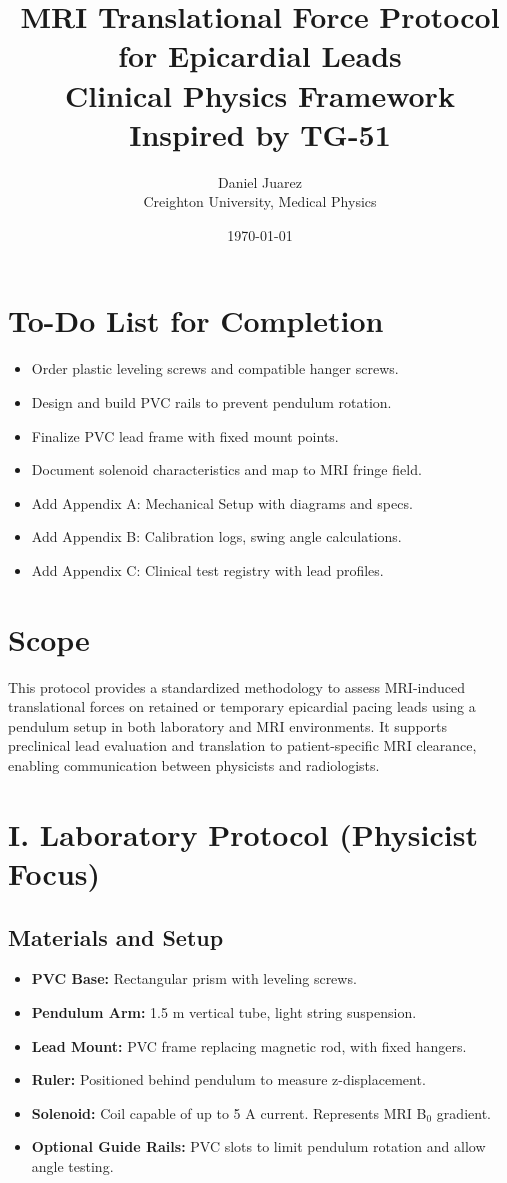 \documentclass[12pt]{article}
\title{\textbf{MRI Translational Force Protocol for Epicardial Leads} \\
	Clinical Physics Framework Inspired by TG-51}
\author{Daniel Juarez \\ Creighton University, Medical Physics}
\date{\today}
\begin{document}
	\maketitle
	
	\section*{To-Do List for Completion}
	\begin{itemize}
		\item Order plastic leveling screws and compatible hanger screws.
		\item Design and build PVC rails to prevent pendulum rotation.
		\item Finalize PVC lead frame with fixed mount points.
		\item Document solenoid characteristics and map to MRI fringe field.
		\item Add Appendix A: Mechanical Setup with diagrams and specs.
		\item Add Appendix B: Calibration logs, swing angle calculations.
		\item Add Appendix C: Clinical test registry with lead profiles.
	\end{itemize}
	
	\section{Scope}
	This protocol provides a standardized methodology to assess MRI-induced translational forces on retained or temporary epicardial pacing leads using a pendulum setup in both laboratory and MRI environments. It supports preclinical lead evaluation and translation to patient-specific MRI clearance, enabling communication between physicists and radiologists.
	
	\section{I. Laboratory Protocol (Physicist Focus)}
	\subsection*{Materials and Setup}
	\begin{itemize}
		\item \textbf{PVC Base:} Rectangular prism with leveling screws.
		\item \textbf{Pendulum Arm:} 1.5 m vertical tube, light string suspension.
		\item \textbf{Lead Mount:} PVC frame replacing magnetic rod, with fixed hangers.
		\item \textbf{Ruler:} Positioned behind pendulum to measure z-displacement.
		\item \textbf{Solenoid:} Coil capable of up to 5 A current. Represents MRI B$_0$ gradient.
		\item \textbf{Optional Guide Rails:} PVC slots to limit pendulum rotation and allow angle testing.
	\end{itemize}
	
\end{document}
